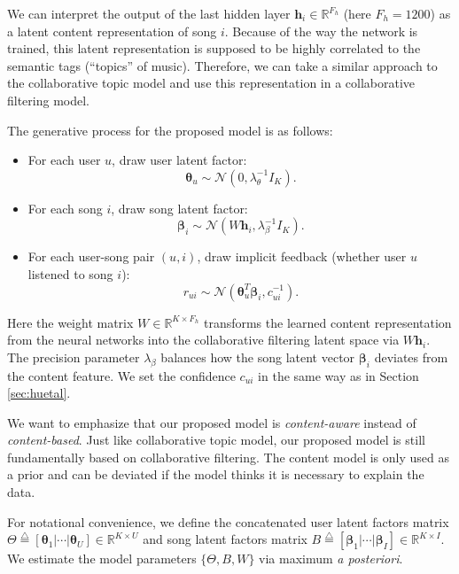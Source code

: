 We can interpret the output of the last hidden layer $\boldsymbol{h}_i \in \mathbb{R}^{F_h}$ (here $F_h = 1200$) as a latent content representation of song $i$. Because of the way the network is trained, this latent representation is supposed to be highly correlated to the semantic tags (``topics'' of music). Therefore, we can take a similar approach to the collaborative topic model and use this representation in a collaborative filtering model. 

The generative process for the proposed model is as follows:
\begin{itemize}
\item For each user $u$, draw user latent factor:
\[\boldsymbol\theta_{u} \sim \mathcal{N}(0, \lambda_\theta^{-1} I_K).\]
\item For each song $i$, draw song latent factor: 
\[\boldsymbol\beta_{i} \sim \mathcal{N}(W \boldsymbol{h}_i, \lambda_\beta^{-1} I_K).\]
\item For each user-song pair $(u, i)$, draw implicit feedback (whether user $u$ listened to song $i$):
\[
r_{ui} \sim \mathcal{N}(\boldsymbol\theta_u^T \boldsymbol\beta_i, c_{ui}^{-1}).
\]
\end{itemize}
Here the weight matrix $W \in \mathbb{R}^{K \times F_h}$ transforms the learned content representation from the neural networks into the collaborative filtering latent space via $W \boldsymbol{h}_i$.  The precision parameter $\lambda_\beta$ balances how the song latent
vector $\boldsymbol\beta_i$ deviates from the content feature. We set the confidence $c_{ui}$ in the same way as in Section \ref{sec:huetal}. 

We want to emphasize that our proposed model is \emph{content-aware} instead of \emph{content-based}. Just like collaborative topic model, our proposed model is still fundamentally based on collaborative filtering. The content model is only used as a prior and can be deviated if the model thinks it is necessary to explain the data. 

For notational convenience, we define the concatenated user latent factors matrix $\Theta \overset{\triangle}{=} [\boldsymbol\theta_1 | \cdots | \boldsymbol\theta_U ]  \in \mathbb{R}^{K \times U}$ and song latent factors matrix $B \overset{\triangle}{=} [\boldsymbol\beta_1 | \cdots | \boldsymbol\beta_I ]  \in \mathbb{R}^{K \times I}$. We estimate the model parameters $\{\Theta, B, W\}$ via maximum \emph{a posteriori}.

